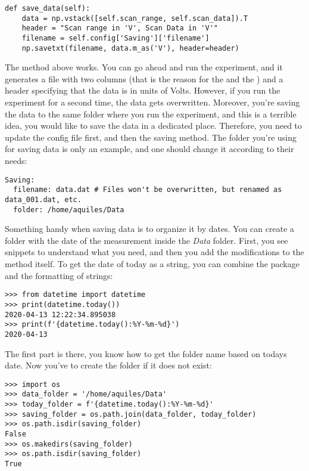 \begin{verbatim}
def save_data(self):
    data = np.vstack([self.scan_range, self.scan_data]).T
    header = "Scan range in 'V', Scan Data in 'V'"
    filename = self.config['Saving']['filename']
    np.savetxt(filename, data.m_as('V'), header=header)
\end{verbatim}

The method above works. You can go ahead and run the experiment, and it generates a file with two columns (that is the reason for the  and the ) and a header specifying that the data is in units of Volts. However, if you run the experiment for a second time, the data gets overwritten. Moreover, you're saving the data to the same folder where you run the experiment, and this is a terrible idea, you would like to save the data in a dedicated place. Therefore, you need to update the config file first, and then the saving method. The folder you're using for saving data is only an example, and one should change it according to their needs:

\begin{verbatim}
Saving:
  filename: data.dat # Files won't be overwritten, but renamed as data_001.dat, etc.
  folder: /home/aquiles/Data
\end{verbatim}

Something handy when saving data is to organize it by dates. You can create a folder with the date of the measurement inside the \emph{Data} folder. First, you see snippets to understand what you need, and then you add the modifications to the method itself. To get the date of today as a string, you can combine the  package and the formatting of strings:

\begin{verbatim}
>>> from datetime import datetime
>>> print(datetime.today())
2020-04-13 12:22:34.895038
>>> print(f'{datetime.today():%Y-%m-%d}')
2020-04-13
\end{verbatim}

The first part is there, you know how to get the folder name based on todays date. Now you've to create the folder if it does not exist:

\begin{verbatim}
>>> import os
>>> data_folder = '/home/aquiles/Data'
>>> today_folder = f'{datetime.today():%Y-%m-%d}'
>>> saving_folder = os.path.join(data_folder, today_folder)
>>> os.path.isdir(saving_folder)
False
>>> os.makedirs(saving_folder)
>>> os.path.isdir(saving_folder)
True
\end{verbatim}

